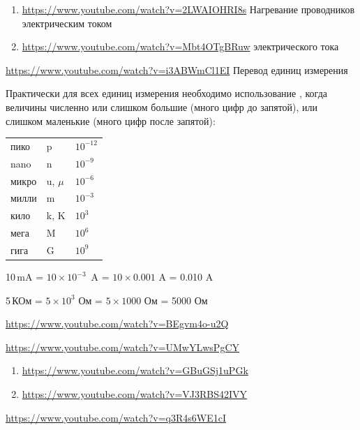 
\begin{youtube}
\begin{enumerate}[nosep]
  \item \url{https://www.youtube.com/watch?v=2LWAIOHRI8s}
  Нагревание проводников электрическим током 
  \item \url{https://www.youtube.com/watch?v=Mbt4OTgBRuw}
   электрического тока
\end{enumerate}
\end{youtube}

\label{bcmux}

\begin{youtube}
\url{https://www.youtube.com/watch?v=i3ABWmCl1EI} Перевод единиц измерения
\end{youtube}

Практически для всех единиц измерения необходимо использование
, когда величины численно
или слишком большие (много цифр до запятой), или слишком маленькие (много цифр
после запятой):

\bigskip
\begin{tabular}{ l l l }
пико & p & $10^{-12}$ \\
nano & n & $10^{-9}$ \\ 
микро & u, $\mu$ & $10^{-6}$ \\ 
милли & m & $10^{-3}$ \\
\hline
кило & k, K & $10^{3}$ \\
мега & M & $10^{6}$ \\
гига & G & $10^{9}$ \\
\end{tabular}
\bigskip

10\,mA = $10 \times 10^{-3}$\ A = $10 \times 0.001$ A = 0.010 A

5\,КОм = $5 \times 10^{3}$ Ом = $5 \times 1000$ Ом = 5000 Ом

\label{bcmmetr}

\begin{youtube}
\url{https://www.youtube.com/watch?v=BEgvm4o-u2Q}

\url{https://www.youtube.com/watch?v=UMwYLwsPgCY}

\begin{enumerate}[nosep]
  \item \url{https://www.youtube.com/watch?v=GBuGSj1uPGk}
  \item \url{https://www.youtube.com/watch?v=VJ3RBS42IVY}
\end{enumerate}

\url{https://www.youtube.com/watch?v=q3R4s6WE1cI}
\end{youtube}

